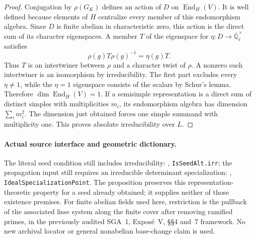 \begin{proof}
Conjugation by $\rho(G_K)$ defines an action of $D$ on
$\operatorname{End}_H(V)$.  It is well defined because elements of
$H$ centralize every member of this endomorphism algebra.  Since $D$
is finite abelian in characteristic zero, this action is the direct
sum of its character eigenspaces.  A member $T$ of the eigenspace for
$\eta:D\to\overline{\mathbb Q}_\ell^\times$ satisfies
\[
 \rho(g)T\rho(g)^{-1}=\eta(g)T.
\]
Thus $T$ is an intertwiner between $\rho$ and a character twist of
$\rho$.  A nonzero such intertwiner is an isomorphism by irreducibility.
The first part excludes every $\eta\ne1$, while the $\eta=1$
eigenspace consists of the scalars by Schur's lemma.  Therefore
$\dim\operatorname{End}_H(V)=1$.
If a semisimple representation is a direct sum of distinct simples
with multiplicities $m_i$, its endomorphism algebra has dimension
$\sum_i m_i^2$.  The dimension just obtained forces one simple
summand with multiplicity one.  This proves absolute irreducibility
over $L$.
\end{proof}

\paragraph{Actual source interface and geometric dictionary.}
The literal seed condition still includes irreducibility:
,
\texttt{IsSeedAlt.irr}; the propagation input still requires an
irreducible determinant specialization:
,
\texttt{IdealSpecializationPoint}.
The proposition preserves this representation-theoretic property for
a seed already obtained; it supplies neither of those existence
premises.  For finite abelian fields used here, restriction is the
pullback of the associated lisse system along the finite cover after
removing ramified primes, in the previously audited SGA~1,
Expos\'e~V, \S\S4 and~7 framework.  No new archival locator or
general nonabelian base-change claim is used.
